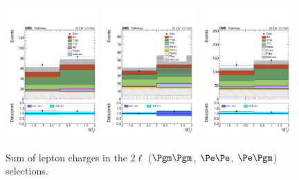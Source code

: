 \begin{figure}[htb]
	\centering 
\includegraphics[width=0.32\textwidth]{plots_leptons/lep_evtsel/2lss_SR/mm/2lep_charge.pdf}
\includegraphics[width=0.32\textwidth]{plots_leptons/lep_evtsel/2lss_SR/ee/2lep_charge.pdf}
\includegraphics[width=0.32\textwidth]{plots_leptons/lep_evtsel/2lss_SR/em/2lep_charge.pdf}
	\caption{Sum of lepton charges in the 2$\ell$ ($\Pgm\Pgm$, $\Pe\Pe$, $\Pe\Pgm$) selections.}
	\label{fig:2l_charge}
\end{figure}


